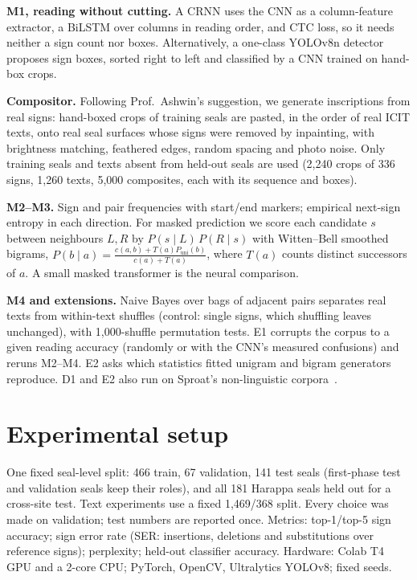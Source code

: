 \documentclass[11pt,a4paper,twocolumn]{article}
\begin{document}
\textbf{M1, reading without cutting.} A CRNN uses the CNN as a column-feature extractor, a BiLSTM over columns in reading order, and CTC loss, so it needs neither a sign count nor boxes. Alternatively, a one-class YOLOv8n detector proposes sign boxes, sorted right to left and classified by a CNN trained on hand-box crops.

\textbf{Compositor.} Following Prof.\ Ashwin's suggestion, we generate inscriptions from real signs: hand-boxed crops of training seals are pasted, in the order of real ICIT texts, onto real seal surfaces whose signs were removed by inpainting, with brightness matching, feathered edges, random spacing and photo noise. Only training seals and texts absent from held-out seals are used (2,240 crops of 336 signs, 1,260 texts, 5,000 composites, each with its sequence and boxes).

\textbf{M2--M3.} Sign and pair frequencies with start/end markers; empirical next-sign entropy in each direction. For masked prediction we score each candidate $s$ between neighbours $L,R$ by $P(s\mid L)\,P(R\mid s)$ with Witten--Bell smoothed bigrams, $P(b\mid a)=\frac{c(a,b)+T(a)P_{\text{uni}}(b)}{c(a)+T(a)}$, where $T(a)$ counts distinct successors of $a$. A small masked transformer is the neural comparison.

\textbf{M4 and extensions.} Naive Bayes over bags of adjacent pairs separates real texts from within-text shuffles (control: single signs, which shuffling leaves unchanged), with 1,000-shuffle permutation tests. E1 corrupts the corpus to a given reading accuracy (randomly or with the CNN's measured confusions) and reruns M2--M4. E2 asks which statistics fitted unigram and bigram generators reproduce. D1 and E2 also run on Sproat's non-linguistic corpora~\cite{sproat2014}.

\section{Experimental setup}
One fixed seal-level split: 466 train, 67 validation, 141 test seals (first-phase test and validation seals keep their roles), and all 181 Harappa seals held out for a cross-site test. Text experiments use a fixed 1,469/368 split. Every choice was made on validation; test numbers are reported once. Metrics: top-1/top-5 sign accuracy; sign error rate (SER: insertions, deletions and substitutions over reference signs); perplexity; held-out classifier accuracy. Hardware: Colab T4 GPU and a 2-core CPU; PyTorch, OpenCV, Ultralytics YOLOv8; fixed seeds.
\end{document}
